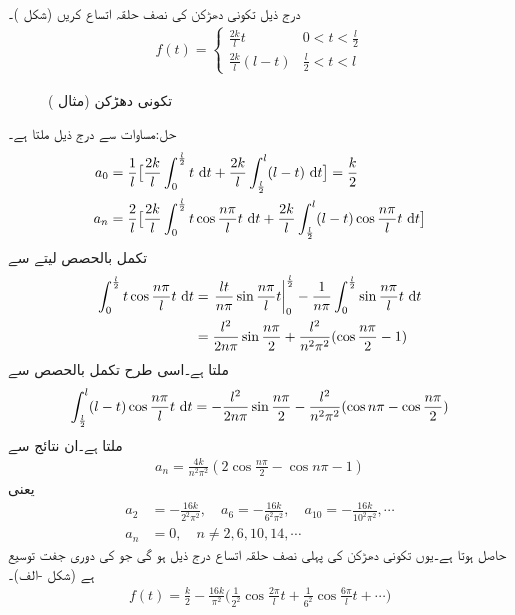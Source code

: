 درج ذیل تکونی دھڑکن کی نصف حلقہ اتساع کریں (شکل )۔
\begin{align*}
f(t)=
\begin{cases}
\frac{2k}{l}t&0<t<\frac{l}{2}\\
\frac{2k}{l}(l-t)&\frac{l}{2}<t<l
\end{cases}
\end{align*}
%
\begin{figure}
\centering
{}
\caption{تکونی دھڑکن (مثال )}
\label{شکل_مثال_فوریئر_تکونی_دھڑکن}
\end{figure}

حل:مساوات  سے درج ذیل ملتا ہے۔
\begin{align*}
a_0&=\frac{1}{l}\big[\frac{2k}{l}\int_0^{\frac{l}{2}}t\,\dif t+\frac{2k}{l}\int_{\frac{l}{2}}^{l}(l-t)\,\dif t\big]=\frac{k}{2}\\
a_n&=\frac{2}{l}\big[\frac{2k}{l}\int_0^{\frac{l}{2}}t\cos \frac{n\pi}{l}t\,\dif t+\frac{2k}{l}\int_{\frac{l}{2}}^{l}(l-t)\cos \frac{n\pi}{l}t\,\dif t\big]
\end{align*}
تکمل بالحصص لیتے  سے
\begin{align*}
\int_0^{\frac{l}{2}}t\cos \frac{n\pi}{l}t\,\dif t&=\left. \frac{lt}{n\pi}\sin \frac{n\pi}{l}t\right|_0^{\frac{l}{2}}-\frac{1}{n\pi}\int_0^{\frac{l}{2}} \sin \frac{n\pi}{l}t\,\dif t\\
&=\frac{l^2}{2n\pi}\sin \frac{n\pi}{2}+\frac{l^2}{n^2\pi^2}(\cos \frac{n\pi}{2}-1)
\end{align*}
ملتا ہے۔اسی طرح تکمل بالحصص سے
\begin{align*}
\int_{\frac{l}{2}}^{l}(l-t)\cos \frac{n\pi}{l}t\,\dif t=-\frac{l^2}{2n\pi}\sin\frac{n\pi}{2}-\frac{l^2}{n^2\pi^2}(\cos n\pi-\cos \frac{n\pi}{2})
\end{align*}
ملتا ہے۔ان نتائج سے
\begin{align*}
a_n=\frac{4k}{n^2\pi^2}(2\cos \frac{n\pi}{2}-\cos n\pi-1)
\end{align*}
یعنی
\begin{align*}
a_2&=-\frac{16k}{2^2\pi^2},\quad a_6=-\frac{16k}{6^2\pi^2},\quad a_{10}=-\frac{16k}{10^2\pi^2},\cdots\\
a_n&=0,\quad n\ne 2,6,10,14,\cdots
\end{align*}
حاصل ہوتا ہے۔یوں تکونی دھڑکن   کی پہلی نصف حلقہ اتساع درج ذیل ہو گی جو  کی دوری جفت توسیع ہے (شکل -الف)۔ 
\begin{align*}
f(t)=\frac{k}{2}-\frac{16k}{\pi^2}\big(\frac{1}{2^2}\cos \frac{2\pi}{l}t+\frac{1}{6^2}\cos \frac{6\pi}{l}t+\cdots\big)
\end{align*} 

